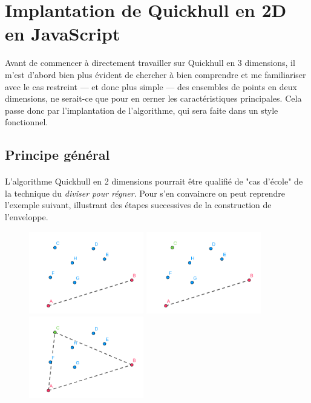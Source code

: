 \documentclass[]{article}
\begin{document}
\pagebreak
\section{Implantation de Quickhull en 2D en JavaScript}
Avant de commencer à directement travailler sur Quickhull en 3 dimensions, il m'est d'abord bien plus évident de chercher à bien comprendre et me familiariser avec le cas restreint — et donc plus simple — des ensembles de points en deux dimensions, ne serait-ce que pour en cerner les caractéristiques principales. Cela passe donc par l'implantation de l'algorithme, qui sera faite dans un style fonctionnel.

\subsection{Principe général}
\paragraph{}
L'algorithme Quickhull en 2 dimensions pourrait être qualifié de "cas d'école" de la technique du \emph{diviser pour régner}. Pour s'en convaincre on peut reprendre l'exemple suivant, illustrant des étapes successives de la construction de l'enveloppe.

\begin{figure}[H]
	\begin{center}
		\includegraphics[width=5cm]{qh2d/geogebra-export.png}
		\includegraphics[width=5cm]{qh2d/geogebra-export2.png}
		\includegraphics[width=5cm]{qh2d/geogebra-export3.png}
	\end{center}
\end{figure}
\end{document}
